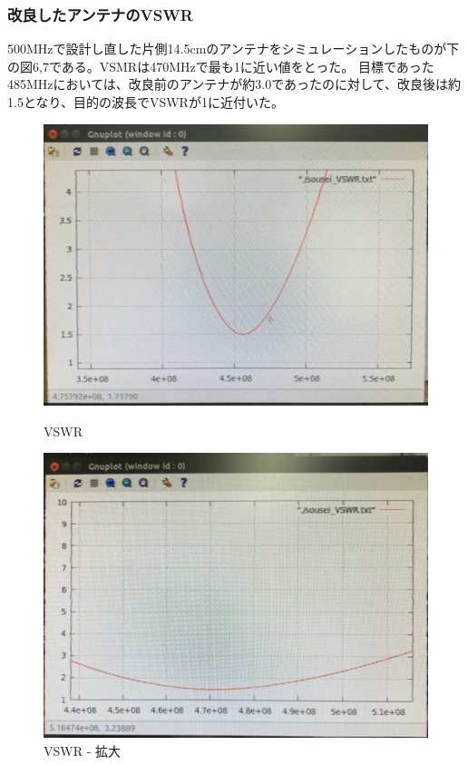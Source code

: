 \documentclass[dvipdfmx,autodetect-engine,titlepage]{jsarticle}
\begin{document}
\subsubsection{改良したアンテナのVSWR}
500MHzで設計し直した片側14.5cmのアンテナをシミュレーションしたものが下の図6,7である。VSMRは470MHzで最も1に近い値をとった。
目標であった485MHzにおいては、改良前のアンテナが約3.0であったのに対して、改良後は約1.5となり、目的の波長でVSWRが1に近付いた。\\
\begin{figure}[H]
  \centering
  \begin{minipage}[b]{0.45\linewidth}
  \begin{center}
    \includegraphics[keepaspectratio,scale=0.17]{fg9.jpg}
    \end{center}
    \caption{VSWR}
  \end{minipage}
  \begin{minipage}[b]{0.45\linewidth}
  \begin{center}
    \includegraphics[keepaspectratio,scale=0.17]{fg10.jpg}
    \end{center}
    \caption{VSWR - 拡大}
  \end{minipage}
\end{figure}
\end{document}
